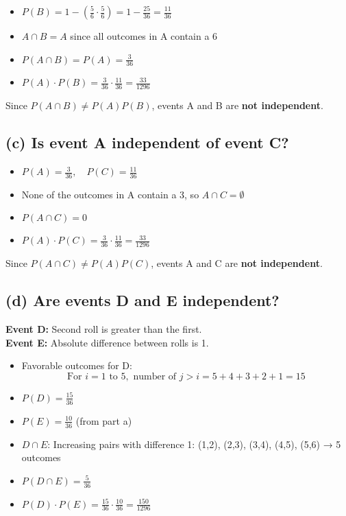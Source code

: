 \documentclass{article}
\begin{document}
\begin{itemize}
    \item \( P(B) = 1 - \left( \frac{5}{6} \cdot \frac{5}{6} \right) = 1 - \frac{25}{36} = \frac{11}{36} \)
    \item \( A \cap B = A \) since all outcomes in A contain a 6
    \item \( P(A \cap B) = P(A) = \frac{3}{36} \)
    \item \( P(A) \cdot P(B) = \frac{3}{36} \cdot \frac{11}{36} = \frac{33}{1296} \)
\end{itemize}

Since \( P(A \cap B) \ne P(A)P(B) \), events A and B are \textbf{not independent}.

\subsection*{(c) Is event A independent of event C?}

\begin{itemize}
    \item \( P(A) = \frac{3}{36}, \quad P(C) = \frac{11}{36} \)
    \item None of the outcomes in A contain a 3, so \( A \cap C = \emptyset \)
    \item \( P(A \cap C) = 0 \)
    \item \( P(A) \cdot P(C) = \frac{3}{36} \cdot \frac{11}{36} = \frac{33}{1296} \)
\end{itemize}

Since \( P(A \cap C) \ne P(A)P(C) \), events A and C are \textbf{not independent}.

\subsection*{(d) Are events D and E independent?}

\textbf{Event D:} Second roll is greater than the first. \\
\textbf{Event E:} Absolute difference between rolls is 1.

\begin{itemize}
    \item Favorable outcomes for D:
    \[
    \text{For } i = 1 \text{ to } 5, \text{ number of } j > i = 5 + 4 + 3 + 2 + 1 = 15
    \]
    \item \( P(D) = \frac{15}{36} \)
    \item \( P(E) = \frac{10}{36} \) (from part a)
    \item \( D \cap E \): Increasing pairs with difference 1: (1,2), (2,3), (3,4), (4,5), (5,6) → 5 outcomes
    \item \( P(D \cap E) = \frac{5}{36} \)
    \item \( P(D) \cdot P(E) = \frac{15}{36} \cdot \frac{10}{36} = \frac{150}{1296} \)
\end{itemize}
\end{document}
